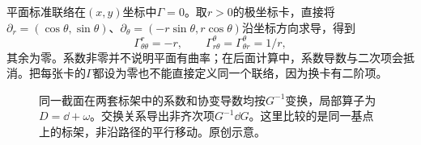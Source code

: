 \begin{example}[极坐标中的非零系数]
平面标准联络在$(x,y)$坐标中$\Gamma=0$。取$r>0$的极坐标卡，直接将$\partial_r=(\cos\theta,\sin\theta)$、$\partial_\theta=(-r\sin\theta,r\cos\theta)$沿坐标方向求导，得到
\[
 \Gamma^r_{\theta\theta}=-r,\qquad
 \Gamma^\theta_{r\theta}=\Gamma^\theta_{\theta r}=1/r,
\]
其余为零。系数非零并不说明平面有曲率；在后面计算中，系数导数与二次项会抵消。把每张卡的$\Gamma$都设为零也不能直接定义同一个联络，因为换卡有二阶项。
\end{example}
\begin{figure}[htbp]
\centering
\caption{同一截面在两套标架中的系数和协变导数均按$G^{-1}$变换，局部算子为$D=\dd+\omega$。交换关系导出非齐次项$G^{-1}\dd G$。这里比较的是同一基点上的标架，非沿路径的平行移动。原创示意。}
\label{fig:connection-frame-change}
\end{figure}

